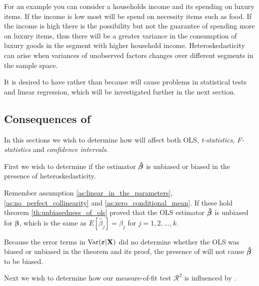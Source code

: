 For an example you can consider a households income and its spending on luxury items. If the income is low most will be spend on necessity items such as food. If the income is high there is the possibility but not the guarantee of spending more on luxury items, thus there will be a greater variance in the consumption of luxury goods in the segment with higher household income. Heteroskedasticity can arise when variances of unobserved factors changes over different segments in the sample space. 

It is desired to have \homo rather than \hetero because \hetero will cause problems in statistical tests and linear regression, which will be investigated further in the next section. 

\subsection{Consequences of \hetero}
In this sections we wish to determine how \hetero will affect both OLS, \textit{t-statistics}, \textit{F-statistics} and \textit{confidence intervals}. 

First we wish to determine if the estimator $\operatorname{\boldsymbol{\hat{\beta}}}$ is unbiased or biased in the presence of heteroskedasticity.  

Remember assumption \ref{as:linear_in_the_parameters}, \ref{as:no_perfect_collinearity} and \ref{as:zero_conditional_mean}. If these hold theorem \ref{th:unbiasedness_of_ols} proved that the OLS estimator $\operatorname{\boldsymbol{\hat{\beta}}}$ is unbiased for $\boldsymbol{\beta}$, which is the same as $E[\hat{\beta}_j] = \beta_j
$ for $j = 1,2, \ldots, k$. 

Because the error terms in $\operatorname{\text{Var}}(\boldsymbol{\varepsilon} | \mathbf{X})$ did no determine whether the OLS was biased or unbiased in the theorem and its proof, the presence of \hetero will not cause $\operatorname{\boldsymbol{\hat{\beta}}}$ to be biased. 

Next we wish to determine how our measure-of-fit test $\mathcal{R}^2$ is influenced by \hetero. 

